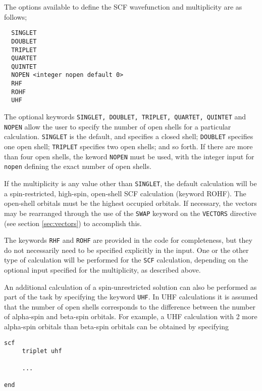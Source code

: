 The options available to define the SCF wavefunction and multiplicity are
as follows;


\begin{verbatim}
  SINGLET 
  DOUBLET 
  TRIPLET 
  QUARTET 
  QUINTET 
  NOPEN <integer nopen default 0>
  RHF
  ROHF
  UHF
\end{verbatim}

The optional keywords \verb+SINGLET, DOUBLET, TRIPLET, QUARTET, QUINTET+ 
and \verb+NOPEN+ allow the user to specify the number of open shells for a 
particular calculation.  \verb+SINGLET+ is the default, and specifies a 
closed shell; \verb+DOUBLET+ specifies one open shell; \verb+TRIPLET+
specifies two open shells; and so forth.  If there are more than four
open shells, the keword \verb+NOPEN+ must be used, with the integer input
for \verb+nopen+ defining the exact number of open shells.

If the multiplicity is any value other than \verb+SINGLET+, the default
calculation will be a spin-restricted,
high-spin, open-shell SCF calculation (keyword ROHF).  The open-shell
orbitals must be the highest occupied orbitals.  If necessary, the vectors
may be rearranged through the use of the \verb+SWAP+ keyword on the
\verb+VECTORS+ directive (see section \ref{sec:vectors}) to accomplish this. 


The keywords \verb+RHF+ and \verb+ROHF+ are provided in
the code for completeness, but they do not necessarily need to be 
specified explicitly in the input.  One or the other type of calculation
will be performed for the \verb+SCF+ calculation, depending on the optional
input specified for the multiplicity, as described above.

An additional calculation of
a spin-unrestricted solution can also be performed as part of the task
by specifying the keyword \verb+UHF+.  In UHF calculations it is
assumed that the number of open shells corresponds to the difference
between the number of alpha-spin and beta-spin orbitals.  For example, 
a UHF calculation
with 2 more alpha-spin orbitals than beta-spin orbitals can be obtained
by specifying

\begin{verbatim}
scf
     triplet uhf

     ...

end
\end{verbatim}


